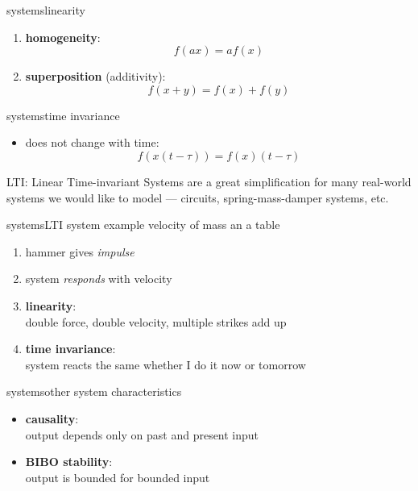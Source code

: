         \begin{frame}{systems}{linearity}
            
            \begin{enumerate}
                \item   \textbf{homogeneity}:
                    \[f(ax) = a f(x)\]
                \bigskip
                \item   \textbf{superposition} (additivity):
                \[f(x+y) = f(x) + f(y)\]
            \end{enumerate}
        \end{frame}
        \begin{frame}{systems}{time invariance}
            
            \begin{itemize}
                \item   does not change with time:
                    \[f\left(x(t-\tau)\right) = f(x)(t-\tau)\]
            \end{itemize}
            \pause
            \bigskip
            \begin{block}{LTI: Linear Time-invariant Systems}
                are a great simplification for many real-world systems we would like to model --- circuits, spring-mass-damper systems, etc.
            \end{block}
        \end{frame}
        \begin{frame}{systems}{LTI system example}
            velocity of mass an a table
            \begin{enumerate}
                \item   hammer gives \textit{impulse}
                \item   system \textit{responds} with velocity
                \bigskip
                \item<2->[]   \textbf{linearity}:\\ double force, double velocity, multiple strikes add up
                \smallskip
                \item<2->[]   \textbf{time invariance}:\\ system reacts the same whether I do it now or tomorrow
            \end{enumerate}
        \end{frame}
        \begin{frame}{systems}{other system characteristics}
            \begin{itemize}
                \item   \textbf{causality}:\\ output depends only on past and present input
                \bigskip
                \item   \textbf{BIBO stability}:\\ output is bounded for bounded input
            \end{itemize}
        \end{frame}
